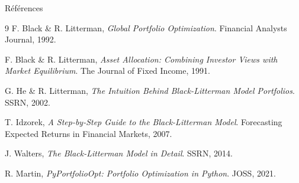 \documentclass[aspectratio=169, 10pt, t]{beamer}
\begin{document}
\begin{frame}{Références}
  \small
  \begin{thebibliography}{9}
      F. Black \& R. Litterman,
      \textit{Global Portfolio Optimization}.
      Financial Analysts Journal, 1992.

      F. Black \& R. Litterman,
      \textit{Asset Allocation: Combining Investor Views with Market Equilibrium}.
      The Journal of Fixed Income, 1991.

      G. He \& R. Litterman,
      \textit{The Intuition Behind Black-Litterman Model Portfolios}.
      SSRN, 2002.

      T. Idzorek,
      \textit{A Step-by-Step Guide to the Black-Litterman Model}.
      Forecasting Expected Returns in Financial Markets, 2007.

      J. Walters,
      \textit{The Black-Litterman Model in Detail}.
      SSRN, 2014.

      R. Martin,
      \textit{PyPortfolioOpt: Portfolio Optimization in Python}.
      JOSS, 2021.
  \end{thebibliography}
\end{frame}
\end{document}
